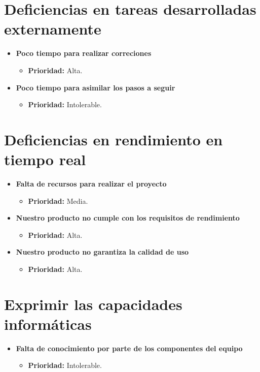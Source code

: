 \documentclass[spanish,a4paper,12pt]{report}	%
\begin{document}
\section{Deficiencias en tareas desarrolladas externamente}
	\begin{itemize}
		\item \textbf{Poco tiempo para realizar correciones}	
			\begin{itemize}
				\item \textbf{Prioridad: }Alta.
			\end{itemize}
		
		\item \textbf{Poco tiempo para asimilar los pasos a seguir}	
			\begin{itemize}
				\item \textbf{Prioridad: }Intolerable.
			\end{itemize}
	\end{itemize}
%
\section{Deficiencias en rendimiento en tiempo real}
	\begin{itemize}
		\item \textbf{Falta de recursos para realizar el proyecto}	
			\begin{itemize}
				\item \textbf{Prioridad: }Media.
			\end{itemize}
		
		\item \textbf{Nuestro producto no cumple con los requisitos de rendimiento}	
			\begin{itemize}
				\item \textbf{Prioridad: }Alta.
			\end{itemize}
		
		\item \textbf{Nuestro producto no garantiza la calidad de uso}	
			\begin{itemize}
				\item \textbf{Prioridad: }Alta.
			\end{itemize}
	\end{itemize}
%
\section{Exprimir las capacidades informáticas}
	\begin{itemize}
		\item \textbf{Falta de conocimiento por parte de los componentes del equipo}	
			\begin{itemize}
				\item \textbf{Prioridad: }Intolerable.
			\end{itemize}
	\end{itemize}
\end{document}
